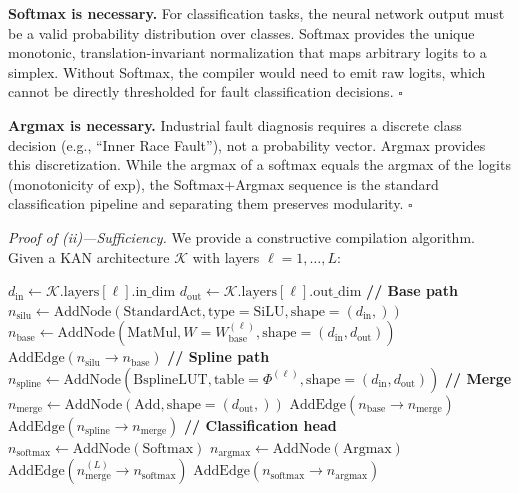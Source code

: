 \vspace{2pt}
\noindent\textbf{Softmax is necessary.}
For classification tasks, the neural network output must be a valid
probability distribution over classes. Softmax provides the unique
monotonic, translation-invariant normalization that maps arbitrary
logits to a simplex. Without Softmax, the compiler would need to
emit raw logits, which cannot be directly thresholded for fault
classification decisions. $\square$

\vspace{2pt}
\noindent\textbf{Argmax is necessary.}
Industrial fault diagnosis requires a discrete class decision (e.g.,
``Inner Race Fault''), not a probability vector. Argmax provides
this discretization. While the argmax of a softmax equals the argmax
of the logits (monotonicity of exp), the Softmax+Argmax sequence is
the standard classification pipeline and separating them preserves
modularity. $\square$

\vspace{4pt}
\noindent\textit{Proof of (ii)---Sufficiency.}
We provide a constructive compilation algorithm. Given a KAN
architecture $\mathcal{K}$ with layers $\ell = 1, \dots, L$:

\begin{algorithmic}[1]
    \State $d_{\text{in}} \gets \mathcal{K}.\text{layers}[\ell].\text{in\_dim}$
    \State $d_{\text{out}} \gets \mathcal{K}.\text{layers}[\ell].\text{out\_dim}$
    \State \textbf{// Base path}
    \State $n_{\text{silu}} \gets \text{AddNode}(\text{StandardAct},
        \text{type}=\text{SiLU}, \text{shape}=(d_{\text{in}},))$
    \State $n_{\text{base}} \gets \text{AddNode}(\text{MatMul},
        W=W_{\text{base}}^{(\ell)}, \text{shape}=(d_{\text{in}}, d_{\text{out}}))$
    \State $\text{AddEdge}(n_{\text{silu}} \to n_{\text{base}})$
    \State \textbf{// Spline path}
    \State $n_{\text{spline}} \gets \text{AddNode}(\text{BsplineLUT},
        \text{table}=\Phi^{(\ell)}, \text{shape}=(d_{\text{in}}, d_{\text{out}}))$
    \State \textbf{// Merge}
    \State $n_{\text{merge}} \gets \text{AddNode}(\text{Add},
        \text{shape}=(d_{\text{out}},))$
    \State $\text{AddEdge}(n_{\text{base}} \to n_{\text{merge}})$
    \State $\text{AddEdge}(n_{\text{spline}} \to n_{\text{merge}})$
\EndFor
\State \textbf{// Classification head}
\State $n_{\text{softmax}} \gets \text{AddNode}(\text{Softmax})$
\State $n_{\text{argmax}} \gets \text{AddNode}(\text{Argmax})$
\State $\text{AddEdge}(n_{\text{merge}}^{(L)} \to n_{\text{softmax}})$
\State $\text{AddEdge}(n_{\text{softmax}} \to n_{\text{argmax}})$
\end{algorithmic}

